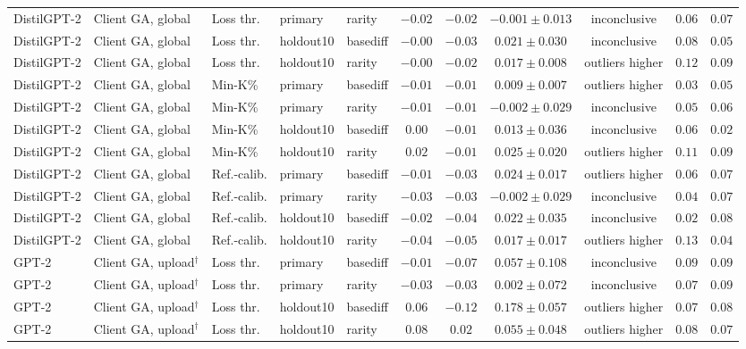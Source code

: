 {\begin{longtable}{@{\extracolsep{\fill}}lllllcccccc@{}}
DistilGPT-2 & Client GA, global & Loss thr. & primary & rarity & $-0.02$ & $-0.02$ & $-0.001 \pm 0.013$ & inconclusive & $0.06$ & $0.07$ \\
DistilGPT-2 & Client GA, global & Loss thr. & holdout10 & basediff & $-0.00$ & $-0.03$ & $0.021 \pm 0.030$ & inconclusive & $0.08$ & $0.05$ \\
DistilGPT-2 & Client GA, global & Loss thr. & holdout10 & rarity & $-0.00$ & $-0.02$ & $0.017 \pm 0.008$ & outliers higher & $0.12$ & $0.09$ \\
DistilGPT-2 & Client GA, global & Min-K\% & primary & basediff & $-0.01$ & $-0.01$ & $0.009 \pm 0.007$ & outliers higher & $0.03$ & $0.05$ \\
DistilGPT-2 & Client GA, global & Min-K\% & primary & rarity & $-0.01$ & $-0.01$ & $-0.002 \pm 0.029$ & inconclusive & $0.05$ & $0.06$ \\
DistilGPT-2 & Client GA, global & Min-K\% & holdout10 & basediff & $0.00$ & $-0.01$ & $0.013 \pm 0.036$ & inconclusive & $0.06$ & $0.02$ \\
DistilGPT-2 & Client GA, global & Min-K\% & holdout10 & rarity & $0.02$ & $-0.01$ & $0.025 \pm 0.020$ & outliers higher & $0.11$ & $0.09$ \\
DistilGPT-2 & Client GA, global & Ref.-calib. & primary & basediff & $-0.01$ & $-0.03$ & $0.024 \pm 0.017$ & outliers higher & $0.06$ & $0.07$ \\
DistilGPT-2 & Client GA, global & Ref.-calib. & primary & rarity & $-0.03$ & $-0.03$ & $-0.002 \pm 0.029$ & inconclusive & $0.04$ & $0.07$ \\
DistilGPT-2 & Client GA, global & Ref.-calib. & holdout10 & basediff & $-0.02$ & $-0.04$ & $0.022 \pm 0.035$ & inconclusive & $0.02$ & $0.08$ \\
DistilGPT-2 & Client GA, global & Ref.-calib. & holdout10 & rarity & $-0.04$ & $-0.05$ & $0.017 \pm 0.017$ & outliers higher & $0.13$ & $0.04$ \\
GPT-2 & Client GA, upload$^{\dagger}$ & Loss thr. & primary & basediff & $-0.01$ & $-0.07$ & $0.057 \pm 0.108$ & inconclusive & $0.09$ & $0.09$ \\
GPT-2 & Client GA, upload$^{\dagger}$ & Loss thr. & primary & rarity & $-0.03$ & $-0.03$ & $0.002 \pm 0.072$ & inconclusive & $0.07$ & $0.09$ \\
GPT-2 & Client GA, upload$^{\dagger}$ & Loss thr. & holdout10 & basediff & $0.06$ & $-0.12$ & $0.178 \pm 0.057$ & outliers higher & $0.07$ & $0.08$ \\
GPT-2 & Client GA, upload$^{\dagger}$ & Loss thr. & holdout10 & rarity & $0.08$ & $0.02$ & $0.055 \pm 0.048$ & outliers higher & $0.08$ & $0.07$ \\

\end{longtable}}
